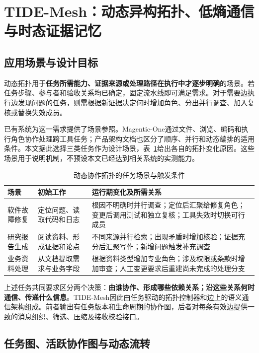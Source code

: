 \section{TIDE-Mesh：动态异构拓扑、低熵通信与时态证据记忆}
\label{sec:tide_mesh}

\subsection{应用场景与设计目标}

动态拓扑用于\textbf{任务所需能力、证据来源或处理路径在执行中才逐步明确}的场景。若任务步骤、参与者和验收关系均已确定，固定流水线即可满足需求。对于需要边执行边发现问题的任务，则需根据新证据决定何时增加角色、分出并行调查、加入复核或替换失效成员。

已有系统为这一需求提供了场景参照。Magentic-One通过文件、浏览、编码和执行角色协作处理跨工具任务\cite{tide_magentic_one}；产品架构文档也区分了顺序、并行和动态编排的适用条件\cite{tide_azure_patterns}。本文据此选择三类任务作为设计场景，表~\ref{tab:mesh_scenarios}给出各自的拓扑变化原因。这些场景用于说明机制，不预设本文已经达到相关系统的实测能力。

\begin{table}[htbp]
\centering
\caption{动态协作拓扑的任务场景与触发条件}
\label{tab:mesh_scenarios}
\begin{tabular}{p{}p{}p{}}
\toprule
场景 & 初始工作 & 运行期变化及所需关系 \\
\midrule
软件故障修复 & 定位问题、读取代码和日志 & 根因不明确时并行调查；定位后汇聚给修复角色；变更后调用测试和独立复核；工具失效时切换可行成员 \\
研究报告生成 & 阅读资料、形成证据和论点 & 不同来源并行检索；出现矛盾时增加核验；证据充分后汇聚写作；新增问题触发补充调查 \\
业务资料处理 & 从文档提取需求与业务字段 & 根据资料类型增加专业角色；涉及权限或条款时增加审查；人工变更要求后重建尚未完成的处理分支 \\
\bottomrule
\end{tabular}
\end{table}

上述任务共同要求区分两个决策：\textbf{由谁协作、形成哪些依赖关系；沿这些关系何时通信、传递什么信息}。TIDE-Mesh因此由任务驱动的拓扑控制器和边上的语义通信架构组成。前者输出有任务版本和生命周期的协作图，后者对每条有效边提供一致的消息组织、筛选、压缩及接收校验接口。

\subsection{任务图、活跃协作图与动态流转}

